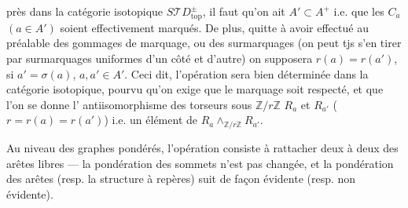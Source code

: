 
près dans la catégorie isotopique $S\mathcal TD_{\mathrm{top}}^\pm$, il faut
 qu'on ait $A'\subset A^+$ i.e. que les $C_a$ $(a\in A')$ soient effectivement marqués.
De plus, quitte à avoir effectué au préalable des gommages de marquage, ou des surmarquages (on peut tjs s'en tirer par surmarquages uniformes d'un côté et d'autre) on supposera $r(a)=r(a')$, si $a'=\sigma(a)$, $a,a'\in A'$.
Ceci dit, l'opération sera bien déterminée dans la catégorie isotopique, pourvu qu'on  exige que le marquage soit respecté, et que l'on se donne l' antiisomorphisme des torseurs sous $\mathbb Z/r\mathbb Z$ $R_a$ et $R_{a'}$ ($r=r(a)=r(a')$) i.e. un élément de
$R_a\mathbin{\wedge}_{\mathbb Z/r\mathbb Z}R_{a'}$.

Au niveau des graphes pondérés, l'opération consiste à rattacher deux à deux  des arêtes libres --- la pondération des sommets n'est pas changée, et la pondération des arêtes (resp. la structure à repères) suit de façon  évidente (resp. non évidente).
